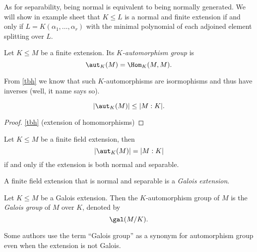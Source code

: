 \documentclass[a4paper]{article}
\begin{document}
\begin{remark}
  As for separability, being normal is equivalent to being normally generated. We will show in example sheet that \(K \leq L\) is a normal and finite extension if and only if \(L = K(\alpha_1, \dots, \alpha_r)\) with the minimal polynomial of each adjoined element splitting over \(L\).
\end{remark}

\begin{definition}
  Let \(K \leq M\) be a finite extension. Its \emph{\(K\)-automorphism group} is
  \[
    \aut_K(M) = \Hom_K(M, M).
  \]
\end{definition}

From \ref{tbh} we know that such \(K\)-automorphisms are isormophisms and thus have inverses (well, it name says so).

\begin{lemma}
  \[
    |\aut_K(M)| \leq |M:K|.
  \]
\end{lemma}

\begin{proof}
  \ref{tbh} (extension of homomorphisms)
\end{proof}

\begin{theorem}
  \label{thm:galois criterion}
  Let \(K \leq M\) be a finite field extension, then
  \[
    |\aut_K(M)| = |M:K|
  \]
  if and only if the extension is both normal and separable.
\end{theorem}

\begin{definition}
  A finite field extension that is normal and separable is a \emph{Galois extension}.
\end{definition}

\begin{definition}
  Let \(K \leq M\) be a Galois extension. Then the \(K\)-automorphism group of \(M\) is the \emph{Galois group} of \(M\) over \(K\), denoted by
  \[
    \gal(M/K).
  \]
\end{definition}

\begin{remark}
  Some authors use the term ``Galois group'' as a synonym for automorphism group even when the extension is not Galois.
\end{remark}
\end{document}

